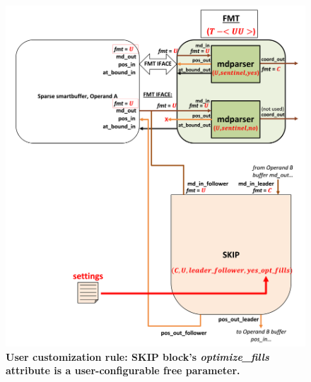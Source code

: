 \begin{figure}[ht]
\includegraphics[width=\textwidth]{figures/safinference_build_10skipoptfillscust.png}
\caption{\textbf{User customization rule: SKIP block's \textit{optimize\_fills} attribute is a user-configurable free parameter. }}
\label{fig:safinference_build_10skipoptfillscust}
\centering
\end{figure}



